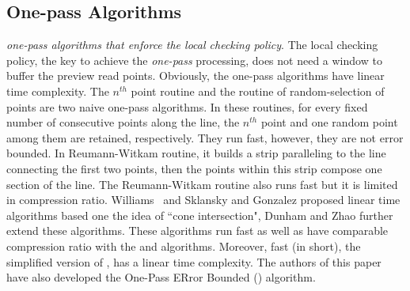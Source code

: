 

\subsection{One-pass Algorithms}


\emph{one-pass algorithms that enforce the local checking policy}.
The local checking policy, the key to achieve the \emph{one-pass} processing, does not need a window to buffer the preview read points.
Obviously, the one-pass algorithms have linear time complexity.
%
The $n^{th}$ point routine and the routine of random-selection of points \cite{Shi:Survey} are two naive one-pass algorithms.
In these routines, for every fixed number of consecutive points along the line, the $n^{th}$ point and one random point among them are retained, respectively.
They run fast, however, they are not error bounded.
%
In Reumann-Witkam routine\cite{Reumann:Strip}, it builds a strip paralleling to the line connecting the first two points, then the points within this strip compose one section of the line.
The Reumann-Witkam routine also runs fast but it is limited in compression ratio.
%
Williams~\cite{Williams:Longest} and Sklansky and Gonzalez \cite{Sklansky:Cone} proposed linear time algorithms based one the idea of ``cone intersection", Dunham \cite{Dunham:Cone} and Zhao \cite{Zhao:Sleeve} further extend these algorithms.
These algorithms run fast as well as have comparable compression ratio with the \dpa and \pavlidis algorithms.
%
Moreover, {fast \bqsa \cite{Liu:BQS} (\fbqsa in short), the simplified version of \bqsa, has a linear time complexity.}
%
The authors of this paper have also developed the One-Pass ERror Bounded (\operb) algorithm\cite{Lin:Operb}.




